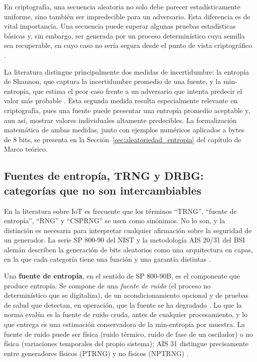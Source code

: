 En criptografía, una secuencia aleatoria no solo debe parecer estadísticamente uniforme, sino también ser impredecible para un adversario. Esta diferencia es de vital importancia. Una secuencia puede superar algunas pruebas estadísticas básicas y, sin embargo, ser generada por un proceso determinístico cuya semilla sea recuperable, en cuyo caso no sería segura desde el punto de vista criptográfico \cite{Shannon1949CommunicationSystems}.

La literatura distingue principalmente dos medidas de incertidumbre: la entropía de Shannon, que captura la incertidumbre promedio de una fuente, y la min-entropía, que estima el peor caso frente a un adversario que intenta predecir el valor más probable \cite{Turan2018RecommendationGeneration}. Esta segunda medida resulta especialmente relevante en criptografía, pues una fuente puede presentar una entropía promedio aceptable y, aun así, mostrar valores individuales altamente predecibles. La formalización matemática de ambas medidas, junto con ejemplos numéricos aplicados a bytes de 8 bits, se presenta en la Sección~\ref{sec:aleatoriedad_entropia} del capítulo de Marco teórico.

\subsection{Fuentes de entropía, TRNG y DRBG: categorías que no son intercambiables}
\label{sec:categorias_rng}

En la literatura sobre IoT es frecuente que los términos ``TRNG'', ``fuente de entropía'', ``RNG'' y ``CSPRNG'' se usen como sinónimos. No lo son, y la distinción es necesaria para interpretar cualquier afirmación sobre la seguridad de un generador. La serie SP 800-90 del NIST y la metodología AIS 20/31 del BSI alemán describen la generación de bits aleatorios como una arquitectura en capas, en la que cada categoría tiene una función y una garantía distintas \cite{Turan2018RecommendationGeneration,Barker2015RecommendationGenerators,Killmann2011AIS31}.

Una \textbf{fuente de entropía}, en el sentido de SP 800-90B, es el componente que produce entropía. Se compone de una \emph{fuente de ruido} (el proceso no determinístico que se digitaliza), de un acondicionamiento opcional y de pruebas de salud que detectan, en operación, que la fuente se ha degradado \cite{Turan2018RecommendationGeneration}. Lo que la norma evalúa es la fuente de ruido cruda, antes de cualquier procesamiento, y lo que entrega es una estimación conservadora de la min-entropía por muestra. La fuente de ruido puede ser física (ruido térmico, ruido de fase de un oscilador) o no física (variaciones temporales del propio sistema); AIS 31 distingue precisamente entre generadores físicos (PTRNG) y no físicos (NPTRNG) \cite{Killmann2011AIS31}.

